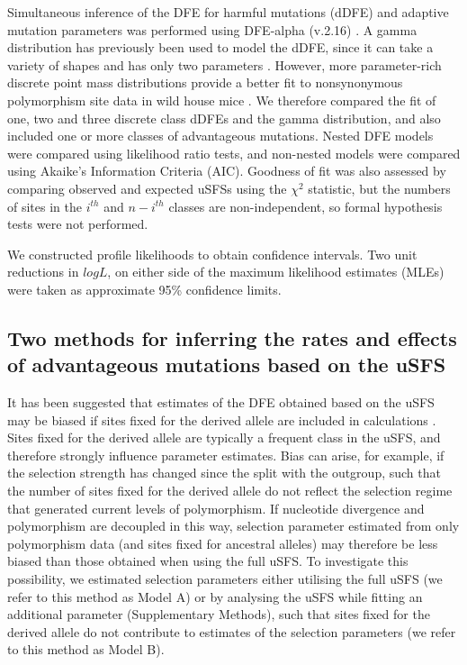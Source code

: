 	Simultaneous inference of the DFE for harmful mutations (dDFE) and adaptive mutation parameters was performed using DFE-alpha (v.2.16) \citep{RN210}. A gamma distribution has previously been used to model the dDFE, since it can take a variety of shapes and has only two parameters \citep{RN109}. However, more parameter-rich discrete point mass distributions provide a better fit to nonsynonymous polymorphism site data in wild house mice \citep{RN178}. We therefore compared the fit of one, two and three discrete class dDFEs and the gamma distribution, and also included one or more classes of advantageous mutations. Nested DFE models were compared using likelihood ratio tests, and non-nested models were compared using Akaike’s Information Criteria (AIC). Goodness of fit was also assessed by comparing observed and expected uSFSs using the $\chi^2$ ­statistic, but the numbers of sites in the $i^{th}$ and $n-i^{th}$ classes are non-independent, so formal hypothesis tests were not performed.

	We constructed profile likelihoods to obtain confidence intervals. Two unit reductions in $logL$, on either side of the maximum likelihood estimates (MLEs) were taken as approximate 95\% confidence limits. 

\subsection{Two methods for inferring the rates and effects of advantageous mutations based on the uSFS}

	It has been suggested that estimates of the DFE obtained based on the uSFS may be biased if sites fixed for the derived allele are included in calculations \citep{RN354}. Sites fixed for the derived allele are typically a frequent class in the uSFS, and therefore strongly influence parameter estimates. Bias can arise, for example, if the selection strength has changed since the split with the outgroup, such that the number of sites fixed for the derived allele do not reflect the selection regime that generated current levels of polymorphism. If nucleotide divergence and polymorphism are decoupled in this way, selection parameter estimated from only polymorphism data (and sites fixed for ancestral alleles) may therefore be less biased than those obtained when using the full uSFS. To investigate this possibility, we estimated selection parameters either utilising the full uSFS (we refer to this method as Model A) or by analysing the uSFS while fitting an additional parameter (Supplementary Methods), such that sites fixed for the derived allele do not contribute to estimates of the selection parameters (we refer to this method as Model B). 


